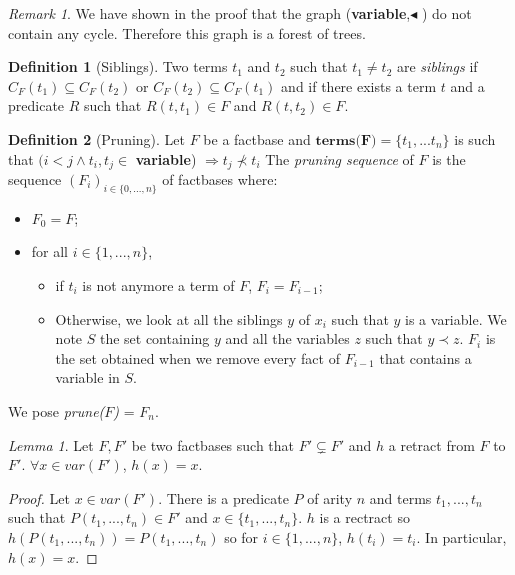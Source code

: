 \documentclass{article}
\theoremstyle{definition}
\newtheorem{definition}{Definition}[section]
\theoremstyle{remark}
\newtheorem{remark}{Remark}[section]
\newtheorem{lemma}{Lemma}[section]
\begin{document}
\begin{remark}
We have shown in the proof that the graph (\textbf{variable},$\blacktriangleleft$ ) do not contain any cycle. Therefore this graph is a forest of trees.
\end{remark}

\begin{definition}[Siblings]
Two terms $t_1$ and $t_2$ such that $t_1 \neq t_2$ are \emph{siblings} if $C_F(t_1) \subseteq C_F(t_2)$ or $C_F(t_2) \subseteq C_F(t_1)$ and if there exists a term $t$ and a predicate $R$ such that $R(t,t_1) \in F$ and $R(t,t_2) \in F$.
\end{definition}

\begin{definition}[Pruning]
Let $F$ be a factbase and $\textbf{terms(F)} = \{t_1,...t_n\}$ is such that $(i<j \wedge t_i,t_j \in$ \textbf{variable}) $\Rightarrow t_j \nprec t_i$
The \emph{pruning sequence} of $F$ is the sequence $(F_i)_{i \in \{0,...,n\}}$ of factbases where:
\begin{itemize}
\item $F_0 = F$;
\item for all $i \in \{1,...,n\}$,
\begin{itemize}
\item if $t_i$ is not anymore a term of $F$, $F_i = F_{i-1}$;
\item Otherwise, we look at all the siblings $y$ of $x_i$ such that $y$ is a variable. We note $S$ the set containing $y$ and all the variables $z$ such that $y \prec z$.  $F_i$ is the set obtained when we remove every fact of $F_{i-1}$  that contains a variable in $S$.
\end{itemize}
\end{itemize}
We pose \emph{prune($F$)} = $F_n$.
\end{definition}

\begin{lemma}
Let $F,F'$ be two factbases such that $F' \subsetneq F'$ and $h$ a retract from $F$ to $F'$. $\forall x \in var(F')$, $h(x) =x$.
\end{lemma}

\begin{proof}
Let $x \in var(F')$. There is a predicate $P$ of arity $n$ and terms $t_1,...,t_n$ such that $P(t_1,...,t_n) \in F'$ and $x \in \{t_1,...,t_n\}$. $h$ is a rectract so $h(P(t_1,...,t_n)) = P(t_1,...,t_n)$ so for $i \in \{1,...,n\}$, $h(t_i) = t_i$. In particular, $h(x) = x$.
\end{proof}
\end{document}
